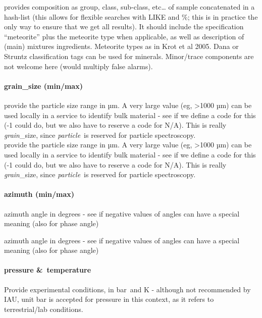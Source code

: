 \documentclass[11pt,a4paper]{ivoa}
\begin{document}
provides composition as group, class, sub-class, etc… of sample concatenated in a hash-list (this allows for flexible searches with LIKE and \%; this is in practice the only way to ensure that we get all results). It should include the specification ``meteorite'' plus the meteorite type when applicable, as well as description of (main) mixtures ingredients. Meteorite types as in Krot et al 2005. Dana or Struntz classification tags can be used for minerals. Minor/trace components are not welcome here (would multiply false alarms).

\paragraph{grain\_size (min/max)}

provide the particle size range in µm. A very large value (eg, >1000 µm) can be used locally in a service to identify bulk material - see if we define a code for this (-1 could do, but we also have to reserve a code for N/A). This is really \emph{grain}\_size, since \emph{particle} is reserved for particle spectroscopy.\\

provide the particle size range in µm. A very large value (eg, >1000 µm) can be used locally in a service to identify bulk material - see if we define a code for this (-1 could do, but we also have to reserve a code for N/A). This is really \emph{grain}\_size, since \emph{particle} is reserved for particle spectroscopy.\\

\paragraph{azimuth (min/max)}

azimuth angle in degrees - see if negative values of angles can have a special meaning (also for phase angle)

azimuth angle in degrees - see if negative values of angles can have a special meaning (also for phase angle)

\paragraph{pressure \& temperature}

Provide experimental conditions, in bar and K - although not recommended by IAU, unit bar is accepted for pressure in this context, as it refers to terrestrial/lab conditions.
\end{document}
